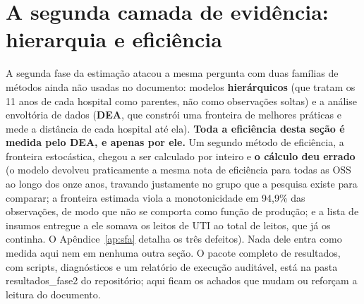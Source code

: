 \section{A segunda camada de evidência: hierarquia e eficiência}
\label{sec:fase2}

A segunda fase da estimação atacou a mesma pergunta com duas famílias
de métodos ainda não usadas no documento: modelos
\textbf{hierárquicos} (que tratam os 11 anos de cada hospital como
parentes, não como observações soltas) e a análise envoltória de dados
(\textbf{DEA}, que constrói uma fronteira de melhores práticas e mede
a distância de cada hospital até ela). \textbf{Toda a eficiência desta
seção é medida pelo DEA, e apenas por ele.} Um segundo método de
eficiência, a fronteira estocástica, chegou a ser calculado por inteiro
e \textbf{o cálculo deu errado} (o modelo devolveu praticamente a mesma
nota de eficiência para todas as OSS ao longo dos onze anos, travando
justamente no grupo que a pesquisa existe para comparar; a fronteira
estimada viola a monotonicidade em 94,9\% das observações, de modo que
não se comporta como função de produção; e a lista de insumos entregue a
ele somava os leitos de UTI ao total de leitos, que já os continha. O
Apêndice~\ref{ap:sfa} detalha os três defeitos). Nada dele entra como
medida aqui nem em nenhuma outra seção. O pacote completo de
resultados, com scripts, diagnósticos e um relatório de execução
auditável, está na pasta resultados\_fase2 do repositório; aqui ficam
os achados que mudam ou reforçam a leitura do documento.

